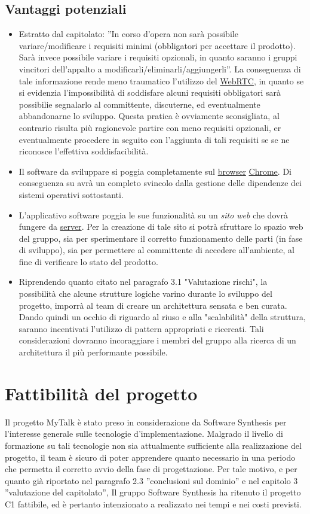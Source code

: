 \subsection{Vantaggi potenziali}
\begin{itemize}
	\item Estratto dal capitolato: ''In corso d'opera non sarà possibile variare/modificare i requisiti minimi (obbligatori per accettare il prodotto). Sarà invece possibile variare i requisiti opzionali, in quanto saranno i gruppi vincitori dell'appalto a modificarli/eliminarli/aggiungerli''. La conseguenza di tale informazione rende meno traumatico l'utilizzo del \underline{WebRTC}, in quanto se si evidenzia l'impossibilità di soddisfare alcuni requisiti obbligatori sarà possibilie segnalarlo al committente, discuterne, ed eventualmente abbandonarne lo sviluppo. Questa pratica è ovviamente sconsigliata, al contrario risulta più ragionevole partire con meno requisiti opzionali, er eventualmente procedere in seguito con l'aggiunta di tali requisiti se se ne riconosce l'effettiva soddisfacibilità.
	\item Il software da sviluppare si poggia completamente sul \underline{browser} \underline{Chrome}. Di conseguenza su avrà un completo svincolo dalla gestione delle dipendenze dei sistemi operativi sottostanti.
	\item L'applicativo software poggia le sue funzionalità su un \textit{sito web} che dovrà fungere da \underline{server}. Per la creazione di tale sito si potrà sfruttare lo spazio web del gruppo, sia per sperimentare il corretto funzionamento delle parti (in fase di sviluppo), sia per permettere al committente di accedere all'ambiente, al fine di verificare lo stato del prodotto.
	\item Riprendendo quanto citato nel paragrafo 3.1 "Valutazione rischi", la possibilità che alcune strutture logiche varino durante lo sviluppo del progetto, imporrà al team di creare un architettura sensata e ben curata. Dando quindi un occhio di riguardo al riuso e alla "scalabilità" della struttura, saranno incentivati l'utilizzo di pattern appropriati e ricercati. Tali considerazioni dovranno incoraggiare i membri del gruppo alla ricerca di un architettura il più performante possibile.
\end{itemize}

\section{Fattibilità del progetto}
Il progetto MyTalk è stato preso in considerazione da Software Synthesis per l'interesse generale sulle tecnologie d'implementazione. Malgrado il livello di formazione su tali tecnologie non sia attualmente sufficiente alla realizzazione del progetto, il team è sicuro di poter apprendere quanto necessario in una periodo che permetta il corretto avvio della fase di progettazione. Per tale motivo, e per quanto già riportato nel paragrafo 2.3 ''conclusioni sul dominio'' e nel capitolo 3 ''valutazione del capitolato'', Il gruppo Software Synthesis ha ritenuto il progetto C1 fattibile, ed è pertanto intenzionato a realizzato nei tempi e nei costi previsti.

